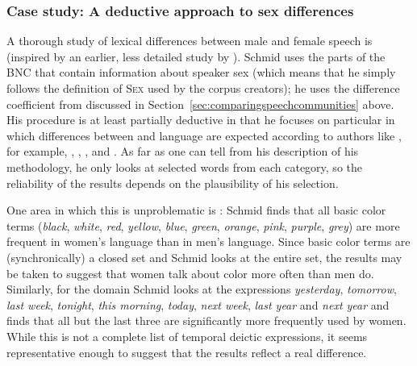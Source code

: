 \subsubsection{Case study: A deductive approach to sex differences}\label{sec:adeductiveapproachtosexdifferences}

A thorough study of lexical differences between male and female speech  is\linebreak\citet{schmid_women_2003} (inspired by an earlier, less detailed study by \citealt{rayson_social_1997}). Schmid uses the parts of the BNC  that contain information about speaker sex (which means that he simply follows the definition of \textsc{Sex} used by the corpus creators); he uses the difference coefficient from \citet{johansson_frequency_1989} discussed in Section~\ref{sec:comparingspeechcommunities} above. His procedure is at least partially deductive  in that he focuses on particular  in which differences between  and  language are expected  according to authors like \citet{lakoff_language_1973}, for example, , , ,  and . As far as one can tell from his description of his methodology, he only looks at selected words from each category, so the reliability  of the results depends on the plausibility of his selection.

One area in which this is unproblematic is : Schmid finds that all basic color terms (\textit{black}, \textit{white}, \textit{red}, \textit{yellow}, \textit{blue}, \textit{green}, \textit{orange}, \textit{pink}, \textit{purple}, \textit{grey}) are more frequent in women's language than in men's language.  Since basic color terms are (synchronically) a closed set and Schmid looks at the entire set, the results may be taken to suggest that women talk about color more often than men do. Similarly, for the domain  Schmid looks at the expressions \textit{yesterday}, \textit{tomorrow}, \textit{last week}, \textit{tonight}, \textit{this morning}, \textit{today}, \textit{next week}, \textit{last year} and \textit{next year} and finds that all but the last three are significantly more frequently used by women. While this is not a complete list of temporal deictic expressions, it seems representative  enough to suggest that the results reflect a real difference.

